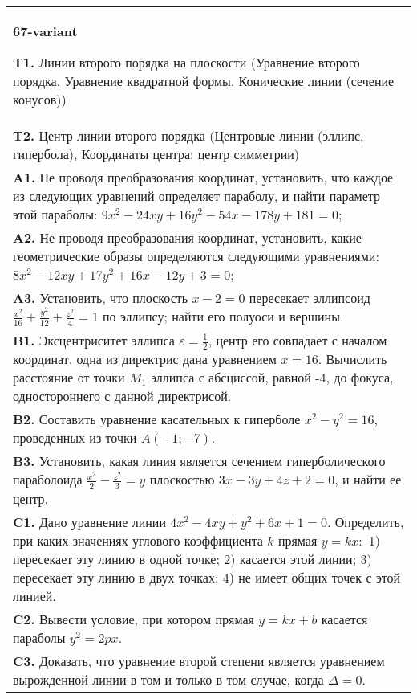 \documentclass{article}
\begin{document}
\begin{tabular}{m{17cm}}
\textbf{67-variant}
\newline

\textbf{T1.} Линии второго порядка на плоскости (Уравнение второго порядка, Уравнение квадратной формы, Конические линии (сечение конусов)) \\
\textbf{T2.} Центр линии второго порядка (Центровые линии (эллипс, гипербола), Координаты центра: центр симметрии) \\
\textbf{A1.} Не проводя преобразования координат, установить, что каждое из следующих уравнений определяет параболу, и найти параметр этой параболы: $9 x^2-24 x y+16 y^2-54 x-178 y+181=0$; \\
\textbf{A2.} Не проводя преобразования координат, установить, какие геометрические образы определяются следующими уравнениями: $8 x^2-12 x y+17 y^2+16 x-12 y+3=0$; \\
\textbf{A3.} Установить, что плоскость $x-2=0$ пересекает эллипсоид $\frac{x^2}{16}+\frac{y^2}{12}+\frac{z^2}{4}=1$ по эллипсу; найти его полуоси и вершины. \\
\textbf{B1.} Эксцентриситет эллипса $\varepsilon=\frac{1}{2}$, центр его совпадает с началом координат, одна из директрис дана уравнением $x=16$. Вычислить расстояние от точки $M_1$ эллипса с абсциссой, равной -4, до фокуса, одностороннего с данной директрисой. \\
\textbf{B2.} Составить уравнение касательных к гиперболе $x^2-y^2=16$, проведенных из точки $A(-1 ;-7)$. \\
\textbf{B3.} Установить, какая линия является сечением гиперболического параболоида $\frac{x^2}{2}-\frac{z^2}{3}=y$ плоскостью $3 x-3 y+4 z+2=0$, и найти ее центр. \\
\textbf{C1.} Дано уравнение линии $4 x^2-4 x y+y^2+6 x+1=0$. Определить, при каких значениях углового коэффициента $k$ прямая $y=k x:$ 1) пересекает эту линию в одной точке; 2) касается этой линии; 3) пересекает эту линию в двух точках; 4) не имеет общих точек с этой линией. \\
\textbf{C2.} Вывести условие, при котором прямая $y=k x+b$ касается параболы $y^2=2 p x$. \\
\textbf{C3.} Доказать, что уравнение второй степени является уравнением вырожденной линии в том и только в том случае, когда $\Delta=0$. \\

\end{tabular}
\vspace{1cm}
\end{document}
